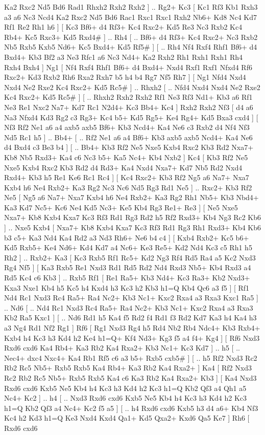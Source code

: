 Ka2 Rxc2  Nd5 Bd6  Rad1 Rhxh2  Rxh2 Rxh2   ] .. Rg2+    Kc3 [  Kc1 Rf3  Kb1 Rxh3  a3 a6  Nc3 Ncd4  Ka2 Rxc2  Nd5 Bd6  Rac1 Rxc1  Rxc1 Rxh2  Nb6+ Kd8  Nc4 Kd7  Rf1 Re2  Rh1 h6   ]  [  Kc3 Bf6+  d4 Rf3+  Kc4 Rxc2+  Kd5 Re3  Nc3 Rxb2  Kc4 Rb4+  Kc5 Rxc3+  Kd5 Rxd4#   ] .. Rh4 [ .. Bf6+  d4 Rf3+  Kc4 Rxc2+  Nc3 Rxb2  Nb5 Rxb5  Kxb5 Nd6+  Kc5 Bxd4+  Kd5 Rf5#   ]  [ .. Rh4  Nf4 Rxf4  Rhf1 Bf6+  d4 Bxd4+  Kb3 Bf2  a3 Ne3  Rfc1 a6  Nc3 Nd4+  Ka2 Rxh2  Rh1 Rxh1  Rxh1 Rh4  Rxh4 Bxh4   ]  Ng1 [  Nf4 Rxf4  Rhf1 Bf6+  d4 Bxd4+  Nxd4 Rxf1  Rxf1 Nfxd4  Rf6 Rxc2+  Kd3 Rxb2  Rh6 Rxa2  Rxh7 b5  h4 b4  Rg7 Nf5  Rh7   ]  [  Ng1 Nfd4  Nxd4 Nxd4  Ne2 Rxe2  Kc4 Rxc2+  Kd5 Rc5#   ] .. Rhxh2 [ .. Nfd4  Nxd4 Nxd4  Ne2 Rxe2  Kc4 Rxc2+  Kd5 Rc5#   ]  [ .. Rhxh2  Rxh2 Rxh2  Rf1 Ne3  Rf3 Nd1+  Kb3 a6  Rf1 Ne3  Re1 Nxc2  Na7+ Kd7  Rc1 N2d4+  Kc3 Bb4+  Kc4   ]  Rxh2   Rxh2    Nf3 [  d4 a6  Na3 Nfxd4  Kd3 Rg2  c3 Rg3+  Kc4 b5+  Kd5 Rg5+  Ke4 Rg4+  Kd5 Bxa3  cxd4   ]  [  Nf3 Rf2  Ne1 a6  a4 axb5  axb5 Bf6+  Kb3 Ncd4+  Ka4 Ne6  c3 Rxb2  d4 Nf4  Nf3 Nd5  Rc1 h5   ] .. Bb4+ [ .. Rf2  Ne1 a6  a4 Bf6+  Kb3 axb5  axb5 Ncd4+  Ka4 Ne6  d4 Bxd4  c3 Be3  b4   ]  [ .. Bb4+  Kb3 Rf2  Ne5 Nxe5  Kxb4 Rxc2  Kb3 Rd2  Nxa7+ Kb8  Nb5 Rxd3+  Ka4 c6  Nc3 b5+  Ka5 Nc4+  Kb4 Nxb2   ]  Kc4 [  Kb3 Rf2  Ne5 Nxe5  Kxb4 Rxc2  Kb3 Rd2  d4 Rd3+  Ka4 Nxd4  Nxa7+ Kd7  Nb5 Rd2  Nxd4 Rxd4+  Kb3 h5  Re1 Ke6  Rc1 Rc4   ]  [  Kc4 Rxc2+  Kb3 Rf2  Ng5 a6  Na7+ Nxa7  Kxb4 h6  Ne4 Rxb2+  Ka3 Rg2  Nc3 Nc6  Nd5 Rg3  Rd1 Ne5   ] .. Rxc2+    Kb3   Rf2    Ne5 [  Ng5 a6  Na7+ Nxa7  Kxb4 h6  Ne4 Rxb2+  Ka3 Rg2  Rh1 Nb5+  Kb3 Nbd4+  Ka3 Kd7  Nc5+ Kc6  Ne4 Kd5  Nc3+ Ke5  Kb4 Rg3  Re1+ Re3   ]  [  Ne5 Nxe5  Nxa7+ Kb8  Kxb4 Kxa7  Kc3 Rf3  Rd1 Rg3  Rd2 h5  Rf2 Rxd3+  Kb4 Ng3  Rc2 Kb6   ] .. Nxe5    Kxb4 [  Nxa7+ Kb8  Kxb4 Kxa7  Kc3 Rf3  Rd1 Rg3  Rh1 Rxd3+  Kb4 Kb6  b3 c5+  Ka3 Nd4  Ka4 Rd2  a3 Nd3  Rh6+ Ne6  b4 c4   ]  [  Kxb4 Rxb2+  Kc5 b6+  Kd5 Rxb5+  Ke4 Nd6+  Kd4 Kd7  a4 Nc6+  Ke3 Re5+  Kd2 Nd4  Kc3 c5  Rh1 h5  Rh2   ] .. Rxb2+    Ka3 [  Kc3 Rxb5  Rf1 Rc5+  Kd2 Ng3  Rf4 Rd5  Ra4 a5  Kc2 Nxd3  Rg4 Nf5   ]  [  Ka3 Rxb5  Re1 Nxd3  Rd1 Rd5  Rd2 Nd4  Rxd3 Nb5+  Kb4 Rxd3  a4 Rd5  Kc4 c6  Kb3   ] .. Rxb5    Rf1 [  Re1 Ra5+  Kb3 Nd4+  Kc3 Ra3+  Kb2 Nxd3+  Kxa3 Nxe1  Kb4 h5  Kc5 h4  Kxd4 h3  Kc3 h2  Kb3 h1=Q  Kb4 Qc6  a3 f5   ]  [  Rf1 Nd4  Rc1 Nxd3  Rc4 Ra5+  Ra4 Nc2+  Kb3 Nc1+  Kxc2 Rxa4  a3 Rxa3  Kxc1 Ra5   ] .. Nd6 [ .. Nd4  Rc1 Nxd3  Rc4 Ra5+  Ra4 Nc2+  Kb3 Nc1+  Kxc2 Rxa4  a3 Rxa3  Kb2 Ra5  Kxc1   ]  [ .. Nd6  Rd1 h5  Ka4 f5  Rd2 f4  Rd1 f3  Rd2 Kd7  Ka3 h4  Ka4 h3  a3 Ng4  Rd1 Nf2  Rg1   ]  Rf6 [  Rg1 Nxd3  Rg4 h5  Rd4 Nb2  Rb4 Ndc4+  Kb3 Rxb4+  Kxb4 h4  Kc3 h3  Kd4 h2  Ke4 h1=Q+  Kf4 Nd3+  Kg3 f5  a4 f4+  Kg4   ]  [  Rf6 Nxd3  Rxd6 cxd6  Ka4 Rb4+  Ka3 Rb2  Ka4 Rxa2+  Kb3 Nc1+  Kc3 Kd7   ] .. h5 [ .. Nec4+  dxc4 Nxc4+  Ka4 Rb1  Rf5 c6  a3 b5+  Rxb5 cxb5#   ]  [ .. h5  Rf2 Nxd3  Rc2 Rb2  Rc5 Nb5+  Rxb5 Rxb5  Ka4 Rb4+  Ka3 Rb2  Ka4 Rxa2+   ]  Ka4 [  Rf2 Nxd3  Rc2 Rb2  Rc5 Nb5+  Rxb5 Rxb5  Ka4 c6  Ka3 Rb2  Ka4 Rxa2+  Kb3   ]  [  Ka4 Nxd3  Rxd6 cxd6  Kxb5 Ne5  Kb4 h4  Kc3 h3  Kd4 h2  Kc3 h1=Q  Kb2 Qf3  a4 Qh1  a5 Nc4+  Kc2   ] .. h4 [ .. Nxd3  Rxd6 cxd6  Kxb5 Ne5  Kb4 h4  Kc3 h3  Kd4 h2  Kc3 h1=Q  Kb2 Qf3  a4 Nc4+  Kc2 f5  a5   ]  [ .. h4  Rxd6 cxd6  Kxb5 h3  d4 a6+  Kb4 Nf3  Kc4 h2  Kd3 h1=Q  Ke3 Nxd4  Kxd4 Qa1+  Kd5 Qxa2+  Kxd6 Qa5  Ke7   ]  Rh6 [  Rxd6 cxd6  